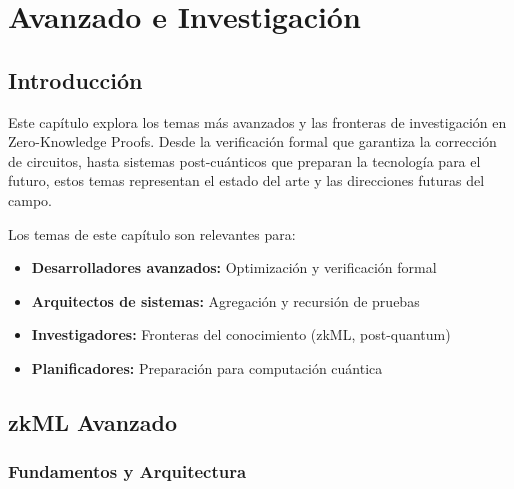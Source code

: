 \documentclass[11pt,a4paper,twoside]{book}
\begin{document}


\chapter{Avanzado e Investigaci\'on}
\label{ch:avanzado-investigacion}

\section*{Introducci\'on}

Este cap\'itulo explora los temas m\'as avanzados y las fronteras de investigaci\'on en Zero-Knowledge Proofs. Desde la verificaci\'on formal que garantiza la correcci\'on de circuitos, hasta sistemas post-cu\'anticos que preparan la tecnolog\'ia para el futuro, estos temas representan el estado del arte y las direcciones futuras del campo.

\begin{keyidea}
Los temas de este cap\'itulo son relevantes para:
\begin{itemize}
    \item \textbf{Desarrolladores avanzados:} Optimizaci\'on y verificaci\'on formal
    \item \textbf{Arquitectos de sistemas:} Agregaci\'on y recursi\'on de pruebas
    \item \textbf{Investigadores:} Fronteras del conocimiento (zkML, post-quantum)
    \item \textbf{Planificadores:} Preparaci\'on para computaci\'on cu\'antica
\end{itemize}
\end{keyidea}

\section{zkML Avanzado}
\label{sec:zkml-advanced}

\subsection{Fundamentos y Arquitectura}
\end{document}
